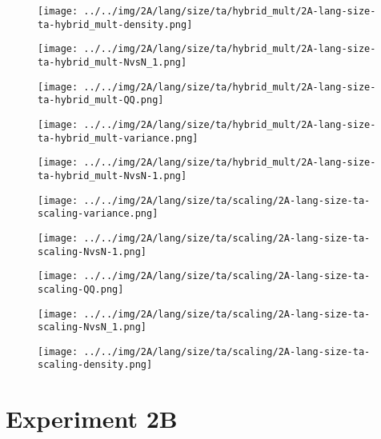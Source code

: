 \begin{figure}[H]
\centering	\texttt{[image: ../../img/2A/lang/size/ta/hybrid\_mult/2A-lang-size-ta-hybrid\_mult-density.png]}
\end{figure}
\begin{figure}[H]
\centering	\texttt{[image: ../../img/2A/lang/size/ta/hybrid\_mult/2A-lang-size-ta-hybrid\_mult-NvsN\_1.png]}
\end{figure}
\begin{figure}[H]
\centering	\texttt{[image: ../../img/2A/lang/size/ta/hybrid\_mult/2A-lang-size-ta-hybrid\_mult-QQ.png]}
\end{figure}
\begin{figure}[H]
\centering	\texttt{[image: ../../img/2A/lang/size/ta/hybrid\_mult/2A-lang-size-ta-hybrid\_mult-variance.png]}
\end{figure}
\begin{figure}[H]
\centering	\texttt{[image: ../../img/2A/lang/size/ta/hybrid\_mult/2A-lang-size-ta-hybrid\_mult-NvsN-1.png]}
\end{figure}
\begin{figure}[H]
\centering	\texttt{[image: ../../img/2A/lang/size/ta/scaling/2A-lang-size-ta-scaling-variance.png]}
\end{figure}
\begin{figure}[H]
\centering	\texttt{[image: ../../img/2A/lang/size/ta/scaling/2A-lang-size-ta-scaling-NvsN-1.png]}
\end{figure}
\begin{figure}[H]
\centering	\texttt{[image: ../../img/2A/lang/size/ta/scaling/2A-lang-size-ta-scaling-QQ.png]}
\end{figure}
\begin{figure}[H]
\centering	\texttt{[image: ../../img/2A/lang/size/ta/scaling/2A-lang-size-ta-scaling-NvsN\_1.png]}
\end{figure}
\begin{figure}[H]
\centering	\texttt{[image: ../../img/2A/lang/size/ta/scaling/2A-lang-size-ta-scaling-density.png]}
\end{figure}
\section{Experiment 2B}
